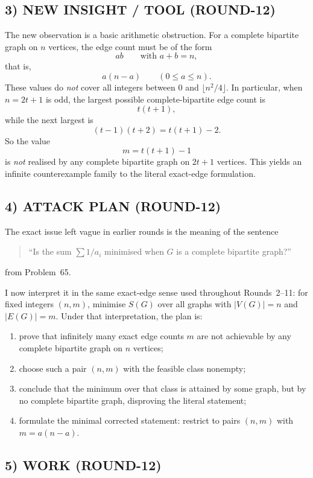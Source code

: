 \subsection*{3) NEW INSIGHT / TOOL (ROUND-12)}

The new observation is a basic arithmetic obstruction.
For a complete bipartite graph on $n$ vertices, the edge count must be of the form
\[
ab
\qquad\text{with }a+b=n,
\]
that is,
\[
a(n-a)\qquad(0\le a\le n).
\]
These values do \emph{not} cover all integers between $0$ and $\lfloor n^2/4\rfloor$.
In particular, when $n=2t+1$ is odd, the largest possible complete-bipartite edge count is
\[
t(t+1),
\]
while the next largest is
\[
(t-1)(t+2)=t(t+1)-2.
\]
So the value
\[
m=t(t+1)-1
\]
is \emph{not} realised by any complete bipartite graph on $2t+1$ vertices.
This yields an infinite counterexample family to the literal exact-edge formulation.

\subsection*{4) ATTACK PLAN (ROUND-12)}

The exact issue left vague in earlier rounds is the meaning of the sentence
\begin{quote}
``Is the sum $\sum 1/a_i$ minimised when $G$ is a complete bipartite graph?''
\end{quote}
from Problem~65.

I now interpret it in the same exact-edge sense used throughout Rounds~2--11:
for fixed integers $(n,m)$, minimise $S(G)$ over all graphs with $|V(G)|=n$ and $|E(G)|=m$.
Under that interpretation, the plan is:
\begin{enumerate}
\item prove that infinitely many exact edge counts $m$ are not achievable by any complete bipartite graph on $n$ vertices;
\item choose such a pair $(n,m)$ with the feasible class nonempty;
\item conclude that the minimum over that class is attained by some graph, but by no complete bipartite graph, disproving the literal statement;
\item formulate the minimal corrected statement: restrict to pairs $(n,m)$ with $m=a(n-a)$.
\end{enumerate}

\subsection*{5) WORK (ROUND-12)}

